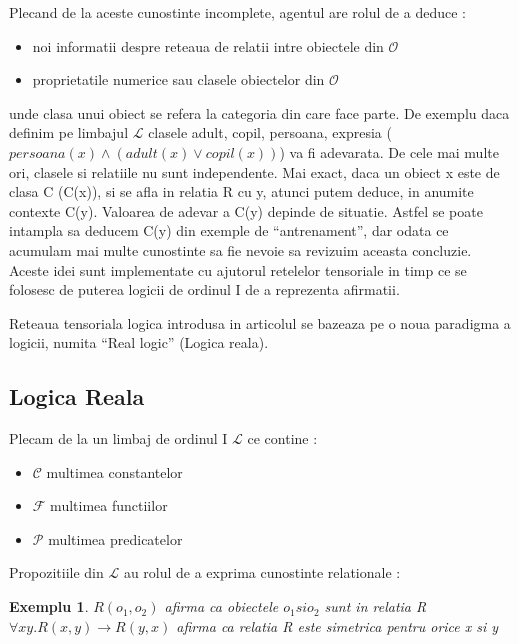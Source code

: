 \documentclass{article}
\newtheorem{example}{Exemplu}[section]
\begin{document}
Plecand de la aceste cunostinte incomplete, agentul are rolul de a deduce \cite{LTN}:\\
\begin{itemize}
	\item noi informatii despre reteaua de relatii intre obiectele din $\mathcal{O}$
	\item proprietatile numerice sau clasele obiectelor din $\mathcal{O}$
\end{itemize}
unde clasa unui obiect se refera la categoria din care face parte. De exemplu daca definim pe limbajul $\mathcal{L}$ clasele adult, copil, persoana, expresia ($persoana(x) \wedge (adult(x) \vee copil(x))$) va fi adevarata. De cele mai multe ori, clasele si relatiile nu sunt independente. Mai exact, daca un obiect x este de clasa C (C(x)), si se afla in relatia R cu y, atunci putem deduce, in anumite contexte C(y). Valoarea de adevar a C(y) depinde de situatie. Astfel se poate intampla sa deducem C(y) din exemple de ``antrenament'', dar odata ce acumulam mai multe cunostinte sa fie nevoie sa revizuim aceasta concluzie. Aceste idei sunt implementate cu ajutorul retelelor tensoriale in timp ce se folosesc de puterea logicii de ordinul I de a reprezenta afirmatii.


Reteaua tensoriala logica introdusa in articolul \cite{LTN} se bazeaza pe o noua paradigma a logicii, numita ``Real logic'' (Logica reala).

\subsection{Logica Reala}
Plecam de la un limbaj de ordinul I $\mathcal{L}$ ce contine \cite{LTN}:\\
\begin{itemize}
	\item $\mathcal{C}$ multimea constantelor
	\item $\mathcal{F}$ multimea functiilor
	\item $\mathcal{P}$ multimea predicatelor
\end{itemize}

Propozitiile din $\mathcal{L}$ au rolul de a exprima cunostinte relationale \cite{LTN}:\\
\begin{example}
$R(o_1, o_2)$ afirma ca obiectele $o_1 si o_2$ sunt in relatia R\\
$\forall xy.R(x, y) \rightarrow R(y, x)$ afirma ca relatia R este simetrica pentru orice x si y
\end{example}
\end{document}
